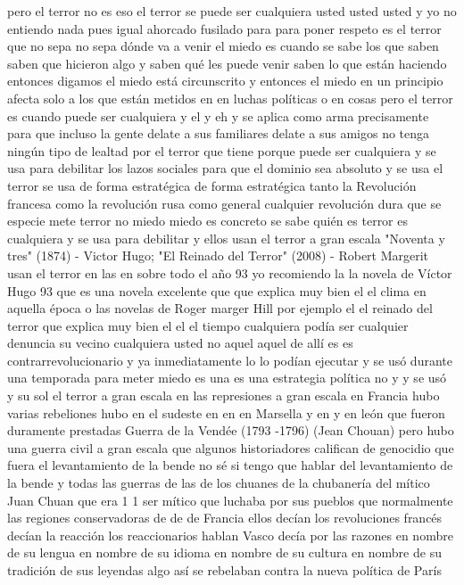 pero el terror no es eso el terror se puede ser cualquiera usted usted usted y yo no entiendo nada pues igual
ahorcado fusilado para para poner respeto es el terror que no sepa no sepa dónde va a venir el miedo es cuando se sabe
los que saben saben que hicieron algo y saben qué les puede venir saben lo que están haciendo entonces digamos el miedo está circunscrito
y entonces el miedo en un principio afecta solo a los que están metidos en en luchas políticas o en cosas
pero el terror es cuando puede ser cualquiera y el y eh y se aplica como arma precisamente para que incluso
la gente delate a sus familiares delate a sus amigos no tenga ningún tipo de lealtad por el terror que tiene porque puede ser cualquiera
y se usa para debilitar los lazos sociales para que el dominio sea absoluto y se usa
el terror se usa de forma estratégica de forma estratégica tanto la Revolución francesa como la revolución rusa
como general cualquier revolución dura que se especie mete terror no miedo miedo es concreto se sabe quién es
terror es cualquiera y se usa para debilitar y ellos usan el terror a gran escala
"Noventa y tres" (1874) - Victor Hugo; "El Reinado del Terror" (2008) - Robert Margerit
usan el terror en las en sobre todo el año 93 yo recomiendo la la novela de Víctor Hugo 93
que es una novela excelente que que explica muy bien el el clima en aquella época o las novelas de Roger marger Hill
por ejemplo el el reinado del terror que explica muy bien el el el tiempo cualquiera podía ser cualquier denuncia
su vecino cualquiera usted no aquel aquel de allí es es contrarrevolucionario y ya inmediatamente
lo lo podían ejecutar y se usó durante una temporada para meter miedo es una es una estrategia política no y y se usó
y su sol el terror a gran escala en las represiones a gran escala en Francia hubo varias rebeliones
hubo en el sudeste en en en Marsella y en y en león que fueron duramente prestadas
Guerra de la Vendée (1793 -1796) (Jean Chouan)
pero hubo una guerra civil a gran escala que algunos historiadores califican de genocidio que fuera el levantamiento de la bende
no sé si tengo que hablar del levantamiento de la bende y todas las guerras de las de los chuanes de la chubanería del mítico Juan Chuan
que era 1 1 ser mítico que luchaba por sus pueblos que normalmente las regiones conservadoras de
de de Francia ellos decían los revoluciones francés decían la reacción
los reaccionarios hablan Vasco decía por las razones en nombre de su lengua en nombre de su idioma
en nombre de su cultura en nombre de su tradición de sus leyendas algo así se rebelaban contra la nueva política de París
